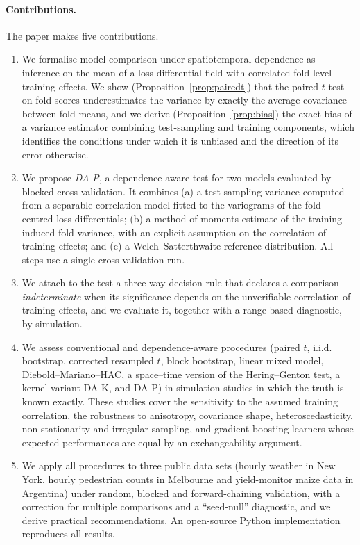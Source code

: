 \paragraph{Contributions.} The paper makes five contributions.
\begin{enumerate}
\item We formalise model comparison under spatiotemporal dependence as inference on the mean of a loss-differential field with correlated fold-level training effects. We show (Proposition~\ref{prop:pairedt}) that the paired $t$-test on fold scores underestimates the variance by exactly the average covariance between fold means, and we derive (Proposition~\ref{prop:bias}) the exact bias of a variance estimator combining test-sampling and training components, which identifies the conditions under which it is unbiased and the direction of its error otherwise.
\item We propose \emph{DA-P}, a dependence-aware test for two models evaluated by blocked cross-validation. It combines (a) a test-sampling variance computed from a separable correlation model fitted to the variograms of the fold-centred loss differentials; (b) a method-of-moments estimate of the training-induced fold variance, with an explicit assumption on the correlation of training effects; and (c) a Welch--Satterthwaite reference distribution. All steps use a single cross-validation run.
\item We attach to the test a three-way decision rule that declares a comparison \emph{indeterminate} when its significance depends on the unverifiable correlation of training effects, and we evaluate it, together with a range-based diagnostic, by simulation.
\item We assess conventional and dependence-aware procedures (paired $t$, i.i.d. bootstrap, corrected resampled $t$, block bootstrap, linear mixed model, Diebold--Mariano--HAC, a space--time version of the Hering--Genton test, a kernel variant DA-K, and DA-P) in simulation studies in which the truth is known exactly. These studies cover the sensitivity to the assumed training correlation, the robustness to anisotropy, covariance shape, heteroscedasticity, non-stationarity and irregular sampling, and gradient-boosting learners whose expected performances are equal by an exchangeability argument.
\item We apply all procedures to three public data sets (hourly weather in New York, hourly pedestrian counts in Melbourne and yield-monitor maize data in Argentina) under random, blocked and forward-chaining validation, with a correction for multiple comparisons and a ``seed-null'' diagnostic, and we derive practical recommendations. An open-source Python implementation reproduces all results.
\end{enumerate}

